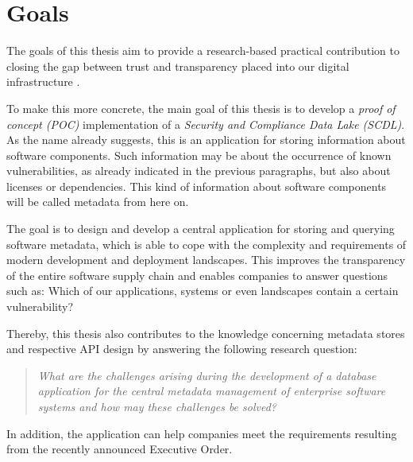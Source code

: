 \section{Goals}
The goals of this thesis aim to provide a research-based practical contribution to closing the gap between trust and transparency placed into our digital infrastructure \cite{ExecutiveOrderSBOM}.\par 
To make this more concrete, the main goal of this thesis is to develop a \textit{proof of concept (POC)} implementation of a \textit{Security and Compliance Data Lake (SCDL)}. As the name already suggests, this is an application for storing information about software components. Such information may be about the occurrence of known vulnerabilities, as already indicated in the previous paragraphs, but also about licenses or dependencies. This kind of information about software components will be called metadata from here on.\par
The goal is to design and develop a central application for storing and querying software metadata, which is able to cope with the complexity and requirements of modern development and deployment landscapes. This improves the transparency of the entire software supply chain and enables companies to answer questions such as: Which of our applications, systems or even landscapes contain a certain vulnerability?\par
Thereby, this thesis also contributes to the knowledge concerning metadata stores and respective API design by answering the following research question:
\begin{quote}
	\emph{What are the challenges arising during the development of a database application for the central metadata management of enterprise software systems and how may these challenges be solved?}
\end{quote}

In addition, the application can help companies meet the requirements resulting from the recently announced Executive Order. 

